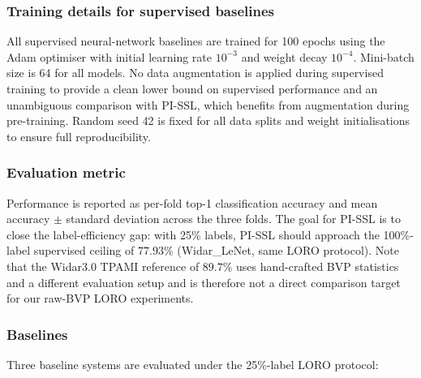 \documentclass[journal]{IEEEtran}
\begin{document}
\subsubsection*{Training details for supervised baselines}
All supervised neural-network baselines are trained for 100 epochs
using the Adam optimiser with initial learning rate $10^{-3}$ and
weight decay $10^{-4}$.
Mini-batch size is 64 for all models.
No data augmentation is applied during supervised training to provide
a clean lower bound on supervised performance and an unambiguous
comparison with PI-SSL, which benefits from augmentation during
pre-training.
Random seed 42 is fixed for all data splits and weight initialisations
to ensure full reproducibility.

\subsubsection*{Evaluation metric}
Performance is reported as per-fold top-1 classification accuracy
and mean accuracy $\pm$ standard deviation across the three folds.
The goal for PI-SSL is to close the label-efficiency gap: with 25\%
labels, PI-SSL should approach the 100\%-label supervised ceiling of
$77.93\%$ (Widar\_LeNet, same LORO protocol).
Note that the Widar3.0 TPAMI reference of $89.7\%$ uses hand-crafted
BVP statistics and a different evaluation setup and is therefore not
a direct comparison target for our raw-BVP LORO experiments.

\subsubsection*{Baselines}
Three baseline systems are evaluated under the 25\%-label LORO
protocol:
\end{document}
